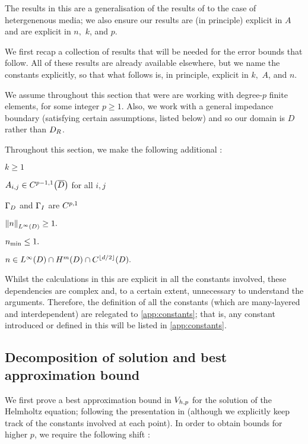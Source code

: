 The results in this  are a generalisation of the results of \cite{DuWu:15} to the case of hetergenenous media; we also ensure our results are (in principle) explicit in $A$ and are explicit in $n,$ $k$, and $p.$

We first recap a collection of results that will be needed for the error bounds that follow. All of these results are already available elsewhere, but we name the constants explicitly, so that what follows is, in principle, explicit in $k,$ $A$, and $n.$

We assume throughout this section that were are working with degree-$p$ finite elements, for some integer $p \geq 1.$ Also, we work with a general impedance boundary (satisfying certain assumptions, listed below) and so our domain is $D$ rather than $D_{R}$.

Throughout this section, we make the following additional :
\label{ass:highp}
\bit
\item $k \geq 1$
\item $\Aij \in \CpmooDclos$ for all $i,j$
\item $\Gamma_{D}$ and $\Gamma_{I}$ are $C^{p,1}$
\item $\NLiD{n} \geq 1.$
\item $n_{\min} \leq 1.$
\item $n \in \LiD \cap \HmD \cap \CfloordtD.$
  \eit
\eas

Whilst the calculations in this  are explicit in all the constants involved, these dependencies are complex and, to a certain extent, unnecessary to understand the arguments. Therefore, the definition of all the constants (which are many-layered and interdependent) are relegated to \cref{app:constants}; that is, any constant introduced or defined in this  will be listed in \cref{app:constants}.

\subsection{Decomposition of solution and best approximation bound}

We first prove a best approximation bound in $V_{h,p}$ for the solution of the Helmholtz equation; following the presentation in \cite{ChNi:18a} (although we explicitly keep track of the constants involved at each point). In order to obtain bounds for higher $p$, we require the following shift :

